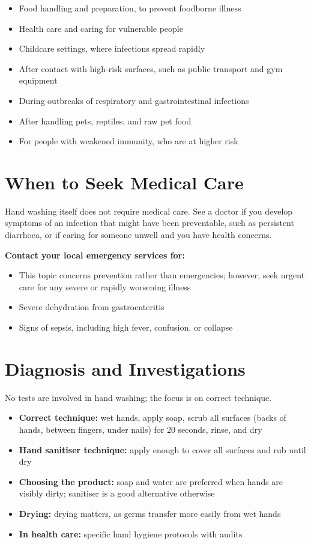 \begin{itemize}
    \item Food handling and preparation, to prevent foodborne illness
    \item Health care and caring for vulnerable people
    \item Childcare settings, where infections spread rapidly
    \item After contact with high-risk surfaces, such as public transport and gym equipment
    \item During outbreaks of respiratory and gastrointestinal infections
    \item After handling pets, reptiles, and raw pet food
    \item For people with weakened immunity, who are at higher risk
\end{itemize}

\section*{When to Seek Medical Care}
Hand washing itself does not require medical care. See a doctor if you develop symptoms of an infection that might have been preventable, such as persistent diarrhoea, or if caring for someone unwell and you have health concerns.

\textbf{Contact your local emergency services for:}
\begin{itemize}
    \item This topic concerns prevention rather than emergencies; however, seek urgent care for any severe or rapidly worsening illness
    \item Severe dehydration from gastroenteritis
    \item Signs of sepsis, including high fever, confusion, or collapse
\end{itemize}

\section*{Diagnosis and Investigations}
No tests are involved in hand washing; the focus is on correct technique.

\begin{itemize}
    \item \textbf{Correct technique:} wet hands, apply soap, scrub all surfaces (backs of hands, between fingers, under nails) for 20 seconds, rinse, and dry
    \item \textbf{Hand sanitiser technique:} apply enough to cover all surfaces and rub until dry
    \item \textbf{Choosing the product:} soap and water are preferred when hands are visibly dirty; sanitiser is a good alternative otherwise
    \item \textbf{Drying:} drying matters, as germs transfer more easily from wet hands
    \item \textbf{In health care:} specific hand hygiene protocols with audits
\end{itemize}

